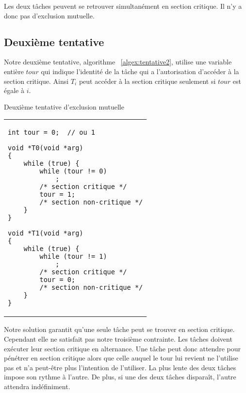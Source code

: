 Les deux tâches peuvent se retrouver simultanément en section critique.  Il n'y a donc pas d'exclusion mutuelle.

\subsection*{Deuxième tentative}
Notre deuxième tentative, algorithme ~\ref{algex:tentative2}, utilise une variable entière $tour$ qui indique l'identité de la tâche qui a l'autorisation d'accéder à la section critique.
Ainsi $T_i$ peut accéder à la section critique seulement si $tour$ est égale à $i$.

\begin{algorithm}[!ht]
\caption{Deuxième tentative d'exclusion mutuelle}\label{algex:tentative2}
\centering
\begin{tabular}{l}
\lstset{language=C++}
\begin{lstlisting}
int tour = 0;  // ou 1

void *T0(void *arg)
{
	while (true) {
		while (tour != 0)
			;
		/* section critique */
		tour = 1;
		/* section non-critique */
	}
}

void *T1(void *arg)
{
	while (true) {
		while (tour != 1)
			;
		/* section critique */
		tour = 0;
		/* section non-critique */
	}
}
\end{lstlisting}
\end{tabular}

\end{algorithm}

Notre solution garantit qu'une seule tâche peut se trouver en section critique.  Cependant elle ne satisfait pas notre troisième contrainte.
Les tâches doivent exécuter leur section critique en alternance.
Une tâche peut donc attendre pour pénétrer en section critique alors que celle auquel le tour lui revient ne l'utilise pas et n'a peut-être plus l'intention de l'utiliser.
La plus lente des deux tâches impose son rythme à l'autre.  De plus, si une des deux tâches disparaît, l'autre attendra indéfiniment.

